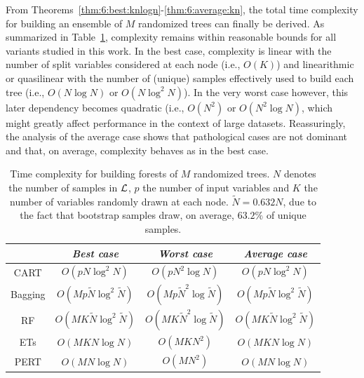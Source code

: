 From Theorems~\ref{thm:6:best:knlogn}-\ref{thm:6:average:kn}, the total time
complexity for building an ensemble of $M$ randomized trees can finally be
derived. As summarized in Table~\ref{table:complexity-fit}, complexity remains
within reasonable bounds for all variants studied in this work. In the best
case, complexity is linear with the number of split variables considered at
each node (i.e., $O(K)$) and linearithmic or quasilinear with the number of
(unique) samples effectively used to build each tree (i.e., $O(N\log N)$ or
$O(N\log^2 N)$). In the very worst case however, this later dependency becomes quadratic
(i.e., $O(N^2)$ or $O(N^2 \log N)$, which might greatly affect performance in
the context of large datasets. Reassuringly, the analysis of the average case
shows that pathological cases are not dominant and that, on average, complexity
behaves as in the best case.

\begin{table}
    \centering
    \begin{tabular}{| c | c c c |}
    \hline
         & \textit{Best case} & \textit{Worst case} & \textit{Average case}  \\
    \hline
    \hline
    CART & $O(pN\log^2 N)$ & $O(pN^2\log N)$ & $O(pN\log^2 N)$ \\
    Bagging & $O(Mp\widetilde{N}\log^2 \widetilde{N})$ & $O(Mp\widetilde{N}^2\log \widetilde{N})$ & $O(Mp\widetilde{N}\log^2 \widetilde{N})$  \\
    RF & $O(MK\widetilde{N}\log^2 \widetilde{N})$ & $O(MK\widetilde{N}^2\log \widetilde{N})$ & $O(MK\widetilde{N}\log^2 \widetilde{N})$  \\
    ETs & $O(MKN\log N)$ & $O(MKN^2)$ & $O(MKN\log N)$  \\
    PERT & $O(MN\log N)$ & $O(MN^2)$ & $O(MN\log N)$  \\
    \hline
    \end{tabular}
    \caption{Time complexity for building forests of $M$ randomized trees. $N$ denotes the number of samples in ${\cal L}$, $p$ the number of input variables and $K$ the number of variables randomly drawn at each node. $\widetilde{N} = 0.632 N$, due to the fact that bootstrap samples draw, on average, $63.2\%$ of unique samples.}
    \label{table:complexity-fit}
\end{table}

